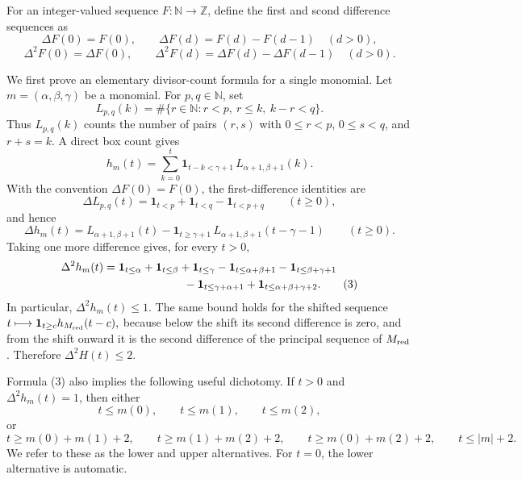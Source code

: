 For an integer-valued sequence $F:\mathbb N\to\mathbb Z$, define the first and scond difference sequences as
\[
  \Delta F(0)=F(0),
  \qquad
  \Delta F(d)=F(d)-F(d-1)\quad(d>0),
\]
\[
  \Delta^2F(0)=\Delta F(0),
  \qquad
  \Delta^2F(d)=\Delta F(d)-\Delta F(d-1)\quad(d>0).
\]

We first prove an elementary divisor-count formula for a single
monomial. Let $m=(\alpha,\beta,\gamma)$ be a monomial. 
For $p,q\in\mathbb N$, set
\[
  L_{p,q}(k)=\#\{r\in\mathbb N:r<p,\ r\le k,\ k-r<q\}.
\]
Thus $L_{p,q}(k)$ counts the number of pairs $(r,s)$ with
$0\le r<p$, $0\le s<q$, and $r+s=k$.  A direct box count gives
\[
  h_m(t)
  =
  \sum_{k=0}^{t}\mathbf 1_{t-k<\gamma+1}\,
  L_{\alpha+1,\beta+1}(k).
\]
With the convention $\Delta F(0)=F(0)$, the first-difference identities are
\[
  \Delta L_{p,q}(t)
  =
  \mathbf 1_{t<p}
  +
  \mathbf 1_{t<q}
  -
  \mathbf 1_{t<p+q}
  \qquad(t\ge0),
\]
and hence
\[
  \Delta h_m(t)
  =
  L_{\alpha+1,\beta+1}(t)
  -
  \mathbf 1_{t\ge \gamma+1}\,
  L_{\alpha+1,\beta+1}(t-\gamma-1)
  \qquad(t\ge 0).
\]
Taking one more difference gives, for every $t>0$,
\begin{align}
  \Delta^2 h_m(t)
  &=
  \mathbf 1_{t\le\alpha}
  +
  \mathbf 1_{t\le\beta}
  +
  \mathbf 1_{t\le\gamma}
  -
  \mathbf 1_{t\le\alpha+\beta+1}
  -
  \mathbf 1_{t\le\beta+\gamma+1}       \notag\\
  &\hspace{2.5cm}
  -
  \mathbf 1_{t\le\gamma+\alpha+1}
  +
  \mathbf 1_{t\le\alpha+\beta+\gamma+2}.              \tag{3}
\end{align}
In particular, $\Delta^2h_m(t)\le 1$. 
The same bound holds for the shifted sequence
$t\longmapsto \mathbf 1_{t\ge c}h_{M_{\rm red}}(t-c),
$
because below the shift its second difference is zero, and from the shift
onward it is the second difference of the principal sequence of
$M_{\rm red}$.  Therefore $\Delta^2H(t)\le 2$.                                      

Formula (3) also implies the following useful dichotomy.  If
$t>0$ and $\Delta^2h_m(t)=1$, then either
\[
  t\le m(0),\qquad t\le m(1),\qquad t\le m(2),              \tag{L}
\]
or
\[
  t\ge m(0)+m(1)+2,\qquad
  t\ge m(1)+m(2)+2,\qquad
  t\ge m(0)+m(2)+2,\qquad
  t\le |m|+2.                                             \tag{U}
\]
We refer to these as the lower and upper alternatives. For $t=0$, the lower alternative is automatic. 


